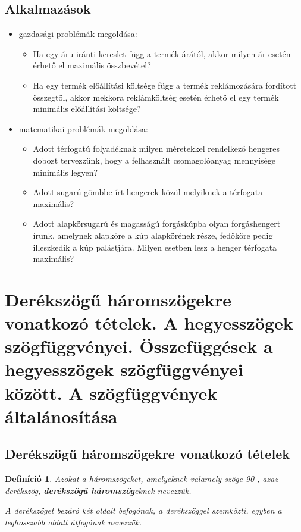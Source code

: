 \documentclass[12pt,a4paper]{article}
\newtheorem{definition}{Definíció} [section]
\begin{document}
\subsection{Alkalmazások}
\begin{itemize}
\item gazdasági problémák megoldása:
\begin{itemize}
\item Ha egy áru iránti kereslet függ a termék árától, akkor milyen ár esetén érhető el maximális összbevétel?
\item Ha egy termék előállítási költsége függ a termék reklámozására fordított összegtől, akkor mekkora reklámköltség esetén érhető el egy termék minimális előállítási költsége?
\end{itemize}
\item matematikai problémák megoldása:
\begin{itemize}
\item Adott térfogatú folyadéknak milyen méretekkel rendelkező hengeres dobozt tervezzünk, hogy a felhasznált csomagolóanyag mennyisége minimális legyen?
\item Adott sugarú gömbbe írt hengerek közül melyiknek a térfogata maximális?
\item Adott alapkörsugarú és magasságú forgáskúpba olyan forgáshengert írunk, amelynek alapköre a kúp alapkörének része, fedőköre pedig illeszkedik a kúp palástjára. Milyen esetben lesz a henger térfogata maximális?
\end{itemize}
\end{itemize}
\newpage







\section{Derékszögű háromszögekre vonatkozó tételek. A hegyesszögek szögfüggvényei. Összefüggések a hegyesszögek szögfüggvényei között. A szögfüggvények általánosítása}

\subsection{Derékszögű háromszögekre vonatkozó tételek}
\begin{definition}
Azokat a háromszögeket, amelyeknek valamely szöge 90$^\circ$, azaz derékszög, \textbf{derékszögű háromszög}eknek nevezzük.

A derékszöget bezáró két oldalt befogónak, a derékszöggel szemközti, egyben a leghosszabb oldalt átfogónak nevezzük.
\end{definition}
\end{document}
